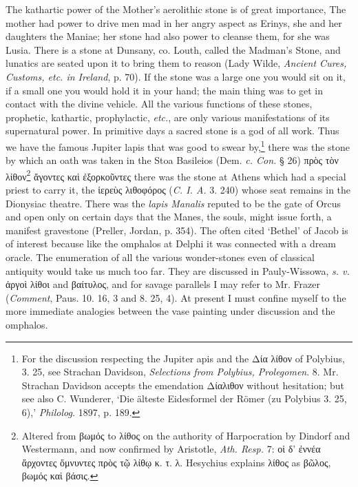 \documentclass[a4paper, 11pt, oneside, polutonikogreek, english]{article}
\begin{document}
The kathartic power of the Mother's aerolithic stone is of great importance, The mother had power to drive men mad in her angry aspect as Erinys, she and her daughters the Maniae; her stone had also power to cleanse them, for she was Lusia. There is a stone at Dunsany, co. Louth, called the Madman's Stone, and lunatics are seated upon it to bring them to reason (Lady Wilde, \emph{Ancient Cures, Customs, etc. in Ireland}, p. 70). If the stone was a large one you would sit on it, if a small one you would hold it in your hand; the main thing was to get in contact with the divine vehicle. All the various functions of these stones, prophetic, kathartic, prophylactic, \emph{etc.}, are only various manifestations of its supernatural power. In primitive days a sacred stone is a god of all work. Thus we have the famous Jupiter lapis that was good to swear by,\footnote{For the discussion respecting the Jupiter apis and the Δία λίθον of Polybius, 3. 25, see Strachan Davidson, \emph{Selections from Polybius, Prolegomen}. 8. Mr. Strachan Davidson accepts the emendation Δίαλιθον without hesitation; but see also C. Wunderer, `Die älteste Eidesformel der Römer (zu Polybius 3. 25, 6),' \emph{Philolog.} 1897, p. 189.} there was the stone by which an oath was taken in the Stoa Basileios (Dem. \emph{c. Con.} § 26) πρὸς τὸν λίθον\footnote{Altered from βωμός to λίθος on the authority of Harpocration by Dindorf and Westermann, and now confirmed by Aristotle, \emph{Ath. Resp.} 7: οἱ δ' ἐννέα ἄρχοντες ὄμνυντες πρὸς τῷ λίθῳ κ. τ. λ. Hesychius explains λίθος as βῶλος, βωμός καὶ βάσις.} ἄγοντες καὶ ἐξορκοῦντες there was the stone at Athens which had a special priest to carry it, the ἱερεὺς λιθοφόρος (\emph{C. I. A.} 3. 240) whose seat remains in the Dionysiac theatre. There was the \emph{lapis Manalis} reputed to be the gate of Orcus and open only on certain days that the Manes, the souls, might issue forth, a manifest gravestone (Preller, Jordan, p. 354). The often cited `Bethel' of Jacob is of interest because like the omphalos at Delphi it was connected with a dream oracle. The enumeration of all the various wonder-stones even of classical antiquity would take us much too far. They are discussed in Pauly-Wissowa, \emph{s. v.} ἀργοὶ λίθοι and βαίτυλος, and for savage parallels I may refer to Mr. Frazer (\emph{Comment}, Paus. 10. 16, 3 and 8. 25, 4). At present I must confine myself to the more immediate analogies between the vase painting under discussion and the omphalos.
\end{document}
